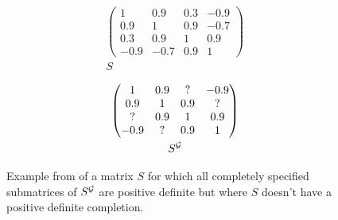 
\begin{figure}[!tbp]
    \begin{minipage}[c]{.3\linewidth}
        \centering
        \begin{gather*}
            \begin{pmatrix}
                1 & 0.9 & 0.3 & -0.9 \\
                0.9 & 1 & 0.9 & -0.7 \\
                0.3 & 0.9 & 1 & 0.9 \\
                -0.9 & -0.7 & 0.9 & 1
            \end{pmatrix}\\
            S
        \end{gather*}
    \end{minipage}
    \hfill
    \begin{minipage}[c]{.2\linewidth}
        \centering
    \end{minipage}
    \hfill
    \begin{minipage}[c]{.3\linewidth} %
        \centering
        \begin{gather*}
             \begin{pmatrix}
                1 & 0.9 & ? & -0.9 \\
                0.9 & 1 & 0.9 & ? \\
                ? & 0.9 & 1 & 0.9 \\
                -0.9 & ? & 0.9 & 1
            \end{pmatrix}\\
            S^{\mathcal{G}}
        \end{gather*}
    \end{minipage}

    \caption{Example from \cite[Section 9.3]{maathuis2018handbook} of a matrix $S$ for which all completely specified submatrices of $S^{\mathcal{G}}$ are positive definite but where $S$ doesn't have a positive definite completion.}
    \label{fig-no-completion}
\end{figure}